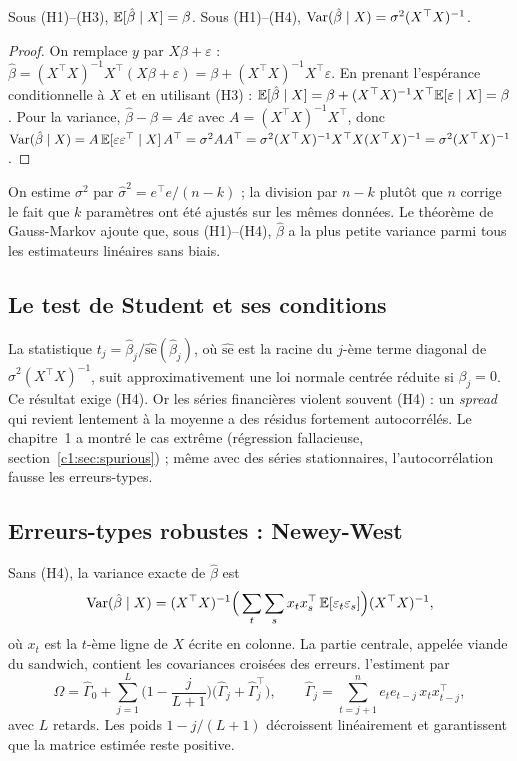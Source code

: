 \begin{proposition}\label{c2:prop:unbiased}
Sous (H1)–(H3), $\mathbb{E}[\hat\beta\mid X] = \beta$. Sous (H1)–(H4), $\operatorname{Var}(\hat\beta\mid X) = \sigma^2(X^\top X)^{-1}$.
\end{proposition}
\begin{proof}
On remplace $y$ par $X\beta+\varepsilon$ : $\hat\beta = (X^\top X)^{-1}X^\top(X\beta+\varepsilon) = \beta + (X^\top X)^{-1}X^\top\varepsilon$. En prenant l'espérance conditionnelle à $X$ et en utilisant (H3) : $\mathbb{E}[\hat\beta\mid X] = \beta + (X^\top X)^{-1}X^\top\mathbb{E}[\varepsilon\mid X] = \beta$. Pour la variance, $\hat\beta - \beta = A\varepsilon$ avec $A = (X^\top X)^{-1}X^\top$, donc $\operatorname{Var}(\hat\beta\mid X) = A\,\mathbb{E}[\varepsilon\varepsilon^\top\mid X]\,A^\top = \sigma^2AA^\top = \sigma^2(X^\top X)^{-1}X^\top X(X^\top X)^{-1} = \sigma^2(X^\top X)^{-1}$.
\end{proof}

On estime $\sigma^2$ par $\hat\sigma^2 = e^\top e/(n-k)$ ; la division par $n-k$ plutôt que $n$ corrige le fait que $k$ paramètres ont été ajustés sur les mêmes données. Le théorème de Gauss-Markov ajoute que, sous (H1)–(H4), $\hat\beta$ a la plus petite variance parmi tous les estimateurs linéaires sans biais.

\subsection{Le test de Student et ses conditions}

La statistique $t_j = \hat\beta_j/\widehat{\mathrm{se}}(\hat\beta_j)$, où $\widehat{\mathrm{se}}$ est la racine du $j$-ème terme diagonal de $\hat\sigma^2(X^\top X)^{-1}$, suit approximativement une loi normale centrée réduite si $\beta_j = 0$. Ce résultat exige (H4). Or les séries financières violent souvent (H4) : un \emph{spread} qui revient lentement à la moyenne a des résidus fortement autocorrélés. Le chapitre~1 a montré le cas extrême (régression fallacieuse, section~\ref{c1:sec:spurious}) ; même avec des séries stationnaires, l'autocorrélation fausse les erreurs-types.

\subsection{Erreurs-types robustes : Newey-West}

Sans (H4), la variance exacte de $\hat\beta$ est
\[
\operatorname{Var}(\hat\beta\mid X) = (X^\top X)^{-1}\Big(\sum_{t}\sum_{s} x_t x_s^\top\,\mathbb{E}[\varepsilon_t\varepsilon_s]\Big)(X^\top X)^{-1},
\]
où $x_t$ est la $t$-ème ligne de $X$ écrite en colonne. La partie centrale, appelée \og viande\fg{} du \og sandwich\fg, contient les covariances croisées des erreurs. \citet{neweywest1987} l'estiment par
\[
\hat\Omega = \hat\Gamma_0 + \sum_{j=1}^{L}\Big(1-\frac{j}{L+1}\Big)\big(\hat\Gamma_j + \hat\Gamma_j^\top\big), \qquad \hat\Gamma_j = \sum_{t=j+1}^{n} e_t e_{t-j}\,x_t x_{t-j}^\top,
\]
avec $L$ retards. Les poids $1 - j/(L+1)$ décroissent linéairement et garantissent que la matrice estimée reste positive.

